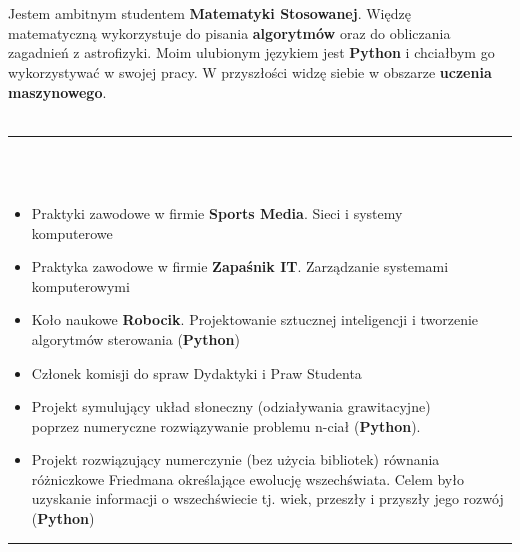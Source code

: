 \documentclass[10pt]{article}
\begin{document}
    \begin{minipage}[t]{0.60\textwidth}
        \fontsize{10pt}{10pt} \\ \\
        Jestem ambitnym studentem \textbf{Matematyki Stosowanej}. Więdzę  \\ matematyczną wykorzystuje do pisania \textbf{algorytmów} oraz do obliczania zagadnień z astrofizyki.
        Moim ulubionym językiem jest \textbf{Python} i chciałbym go wykorzystywać w swojej pracy. W przyszłości widzę siebie w obszarze \textbf{uczenia maszynowego}. \\ \\
        \rule{11cm}{1pt} \\ \\
        \fontsize{10pt}{10pt}
        \begin{itemize}[leftmargin=*]
            \setlength{\parskip}{0pt}
            \item Praktyki zawodowe w firmie \textbf{Sports Media}. Sieci i systemy \\ komputerowe
            \item Praktyka zawodowe w firmie \textbf{Zapaśnik IT}. Zarządzanie systemami  \\komputerowymi
            \item Koło naukowe \textbf{Robocik}. Projektowanie sztucznej inteligencji i tworzenie algorytmów sterowania (\textbf{Python})
            \item Członek komisji do spraw Dydaktyki i Praw Studenta
            \item Projekt symulujący układ słoneczny (odziaływania grawitacyjne) \\ poprzez numeryczne rozwiązywanie problemu n-ciał  (\textbf{Python}). 
            \item Projekt rozwiązujący numerczynie (bez użycia bibliotek) równania różniczkowe Friedmana określające ewolucję wszechświata.
            Celem było uzyskanie informacji o wszechświecie tj. wiek, przeszły i przyszły jego rozwój (\textbf{Python})
        \end{itemize}
        \rule{11cm}{1pt} \\ \\
        \fontsize{10pt}{10pt}
        \begin{itemize}[leftmargin=*]
            \setlength{\parskip}{0pt}

\end{itemize}
\end{minipage}
\end{document}
